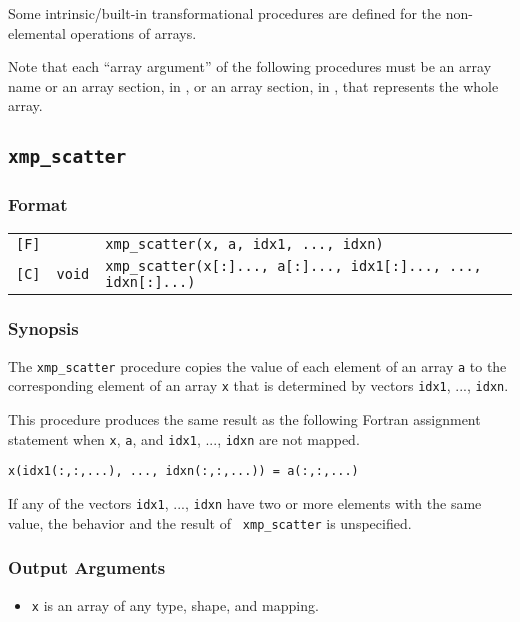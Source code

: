 Some intrinsic/built-in transformational procedures are defined for
the non-elemental operations of arrays.

Note that each ``array argument'' of the following procedures must be
an array name or an array section, in {\XMPF}, or an array section, in
{\XMPC}, that represents the whole array.

\subsection{\tt xmp\_scatter}
\label{155158_16Jan17}

\subsubsection*{Format}

\begin{tabular}{lll}

\verb![F]!&            & {\tt xmp\_scatter(x, a, idx1, ..., idxn)}\\

\verb![C]!& {\tt void} & {\tt xmp\_scatter(x[:]..., a[:]..., idx1[:]..., ..., idxn[:]...)}\\

\end{tabular}

\subsubsection*{Synopsis}

The {\tt xmp\_scatter} procedure copies the value of each element of
an array {\tt a} to the corresponding element of an array {\tt x}
that is determined by vectors {\tt idx1}, ..., {\tt idxn}.

This procedure produces the same result as the following Fortran
assignment statement when {\tt x}, {\tt a}, and {\tt idx1}, ...,
{\tt idxn} are not mapped.

\begin{verbatim}
x(idx1(:,:,...), ..., idxn(:,:,...)) = a(:,:,...)
\end{verbatim}

If any of the vectors {\tt idx1}, ..., {\tt idxn} have two or more
elements with the same value, the behavior and the result of {\tt
xmp\_scatter} is unspecified.


\subsubsection*{Output Arguments}
\begin{itemize}
 \item {\tt x} is an array of any type, shape, and mapping.
\end{itemize}

